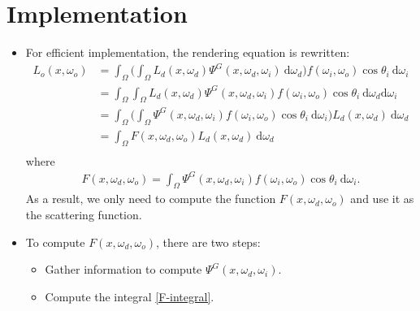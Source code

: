 \documentclass[10pt]{article}
\newcommand{\dee}{\mathrm{d}}
\begin{document}
  \section{Implementation}
  \begin{itemize}
    \item For efficient implementation, the rendering equation is rewritten:
    \begin{align*}
      L_o(x, \omega_o)
      &= \int_{\Omega} \bigg( \int_{\Omega} L_d(x, \omega_d) \Psi^G(x, \omega_d, \omega_i)\ \dee \omega_d \bigg) f(\omega_i, \omega_o) \cos \theta_i\ \dee \omega_i \\
      &= \int_{\Omega} \int_{\Omega} L_d(x, \omega_d) \Psi^G(x, \omega_d, \omega_i) f(\omega_i, \omega_o) \cos \theta_i\ \dee \omega_d \dee \omega_i \\
      &= \int_{\Omega} \bigg( \int_{\Omega} \Psi^G(x, \omega_d, \omega_i) f(\omega_i, \omega_o) \cos \theta_i\ \dee\omega_i \bigg) L_d(x, \omega_d)\ \dee \omega_d \\
      &= \int_{\Omega} F(x,\omega_d,\omega_o) L_d(x, \omega_d)\ \dee \omega_d \\
    \end{align*}
    where
    \begin{align} \label{F-integral}
      F(x,\omega_d,\omega_o) = \int_{\Omega} \Psi^G(x, \omega_d, \omega_i) f(\omega_i, \omega_o) \cos \theta_i\ \dee\omega_i. 
    \end{align}
    As a result, we only need to compute the function $F(x,\omega_d, \omega_o)$ and use it as the scattering function.

    \item To compute $F(x,\omega_d,\omega_o)$, there are two steps:
    \begin{itemize}
      \item Gather information to compute $\Psi^G(x, \omega_d, \omega_i)$.
      \item Compute the integral \eqref{F-integral}.
    \end{itemize}
  \end{itemize}
\end{document}
